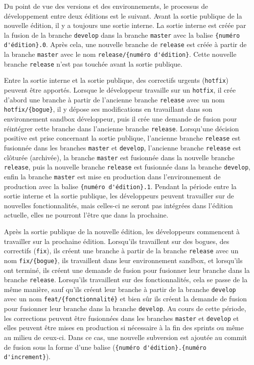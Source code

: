 Du point de vue des versions et des environnements, le processus de développement entre deux éditions est le suivant. Avant la sortie publique de la nouvelle édition, il y a toujours une sortie interne. La sortie interne est créée par la fusion de la branche \Verb|develop| dans la branche \Verb|master| avec la balise \Verb|{numéro d'édition}.0|. Après cela, une nouvelle branche de \Verb|release| est créée à partir de la branche \Verb|master| avec le nom \Verb|release/{numéro d'édition}|. Cette nouvelle branche \Verb|release| n'est pas touchée avant la sortie publique.

Entre la sortie interne et la sortie publique, des correctifs urgents (\Verb|hotfix|) peuvent être apportés. Lorsque le développeur travaille sur un \Verb|hotfix|, il crée d'abord une branche à partir de l'ancienne branche \Verb|release| avec un nom \Verb|hotfix/{bogue}|, il y dépose ses modifications en travaillant dans son environnement sandbox développeur, puis il crée une demande de fusion pour réintégrer cette branche dans l'ancienne branche \Verb|release|. Lorsqu'une décision positive est prise concernant la sortie publique, l'ancienne branche \Verb|release| est fusionnée dans les branches \Verb|master| et \Verb|develop|, l'ancienne branche \Verb|release| est clôturée (archivée), la branche \Verb|master| est fusionnée dans la nouvelle branche \Verb|release|, puis la nouvelle branche \Verb|release| est fusionnée dans la branche \Verb|develop|, enfin la branche \Verb|master| est mise en production dans l'environnement de production avec la balise \Verb|{numéro d'édition}.1|. Pendant la période entre la sortie interne et la sortie publique, les développeurs peuvent travailler sur de nouvelles fonctionnalités, mais celles-ci ne seront pas intégrées dans l'édition actuelle, elles ne pourront l'être que dans la prochaine.

Après la sortie publique de la nouvelle édition, les développeurs commencent à travailler sur la prochaine édition. Lorsqu'ils travaillent sur des bogues, des correctifs (\Verb|fix|), ils créent une branche à partir de la branche \Verb|release| avec un nom \Verb|fix/{bogue}|, ils travaillent dans leur environnement sandbox, et lorsqu'ils ont terminé, ils créent une demande de fusion pour fusionner leur branche dans la branche \Verb|release|. Lorsqu'ils travaillent sur des fonctionnalités, cela se passe de la même manière, sauf qu'ils créent leur branche à partir de la branche \Verb|develop| avec un nom \Verb|feat/{fonctionnalité}| et bien sûr ils créent la demande de fusion pour fusionner leur branche dans la branche \Verb|develop|. Au cours de cette période, les corrections peuvent être fusionnées dans les branches \Verb|master| et \Verb|develop| et elles peuvent être mises en production si nécessaire à la fin des sprints ou même au milieu de ceux-ci. Dans ce cas, une nouvelle subversion est ajoutée au commit de fusion sous la forme d'une balise (\Verb|{numéro d'édition}.{numéro d'increment}|).

